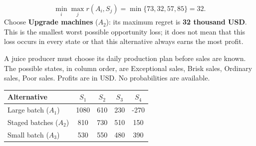 \[\min_i\max_j r(A_i,S_j)=\min\{73,32,57,85\}=32.\]
Choose \textbf{Upgrade machines} ($A_2$): its maximum regret is \textbf{32 thousand USD}. This is the smallest worst possible opportunity loss; it does not mean that this loss occurs in every state or that this alternative always earns the most profit.
\par\vspace{4mm}

\clearpage
{}
A juice producer must choose its daily production plan before sales are known. The possible states, in column order, are Exceptional sales, Brisk sales, Ordinary sales, Poor sales. Profits are in USD. No probabilities are available.
\begin{center}
\begin{tabular}{@{}lcccc@{}}\toprule
Alternative & $S_1$ & $S_2$ & $S_3$ & $S_4$\\\midrule
Large batch ($A_1$) & 1080 & 610 & 230 & -270\\
Staged batches ($A_2$) & 810 & 730 & 510 & 150\\
Small batch ($A_3$) & 530 & 550 & 480 & 390\\
\bottomrule\end{tabular}
\end{center}
